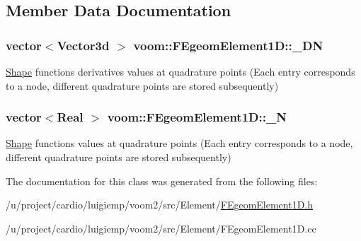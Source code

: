 \subsection{Member Data Documentation}
\hypertarget{classvoom_1_1_f_egeom_element1_d_ac24d6f4aa2a37ac19e703b1af4053d17}{
\subsubsection[{\_\-DN}]{\setlength{\rightskip}{0pt plus 5cm}vector$<$Vector3d $>$ {\bf voom::FEgeomElement1D::\_\-DN}}}
\label{classvoom_1_1_f_egeom_element1_d_ac24d6f4aa2a37ac19e703b1af4053d17}
\hyperlink{classvoom_1_1_shape}{Shape} functions derivatives values at quadrature points (Each entry corresponds to a node, different quadrature points are stored subsequently) \hypertarget{classvoom_1_1_f_egeom_element1_d_a3fdff0f1167383a0aaddad60100debe7}{
\subsubsection[{\_\-N}]{\setlength{\rightskip}{0pt plus 5cm}vector$<$Real $>$ {\bf voom::FEgeomElement1D::\_\-N}}}
\label{classvoom_1_1_f_egeom_element1_d_a3fdff0f1167383a0aaddad60100debe7}
\hyperlink{classvoom_1_1_shape}{Shape} functions values at quadrature points (Each entry corresponds to a node, different quadrature points are stored subsequently) 

The documentation for this class was generated from the following files:\begin{DoxyCompactItemize}
\item 
/u/project/cardio/luigiemp/voom2/src/Element/\hyperlink{_f_egeom_element1_d_8h}{FEgeomElement1D.h}\item 
/u/project/cardio/luigiemp/voom2/src/Element/FEgeomElement1D.cc\end{DoxyCompactItemize}
